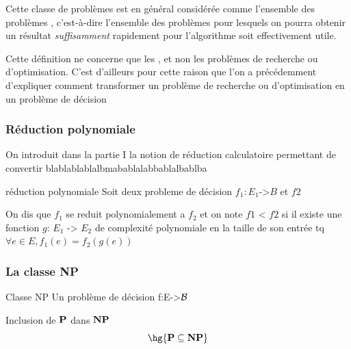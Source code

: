 \documentclass[a4paper,french,bookmarks]{book}
\newcommand{\cP}{\bbP}
\newcommand{\cNP}{\bbN\bbP}
\begin{document}
    Cette classe de problèmes est en général considérée comme l'ensemble des problèmes , c'est-à-dire l'ensemble des problèmes pour lesquels on pourra obtenir un résultat \emph{suffisamment} rapidement pour l'algorithme soit effectivement utile.
    
    \begin{warning}{}{}
        Cette définition ne concerne que les , et non les problèmes de recherche ou d'optimisation. C'est d'ailleurs pour cette raison que l'on a précédemment d'expliquer comment transformer un problème de recherche ou d'optimisation en un problème de décision 
    \end{warning}
    
    
    \subsubsection{Réduction polynomiale}
    
    On introduit dans la partie I la notion de réduction calculatoire permettant de convertir 
    blablablablalbmabablalabbablalbablba
    
    
    \begin{definition}{réduction polynomiale}{}
        Soit deux probleme de décision $f_1: E_1 \text{->} B$ et $f2$
        
        On dis que $f_1$ se reduit polynomialement a $f_2$ et on note $f1$ < $f2$ si il existe une fonction 
        $g$: $E_1$ -> $E_2$ de complexité polynomiale en la taille de son entrée tq $\forall e \in E, f_1(e) = f_2(g(e))$
        
    
    
    \end{definition}
    
    
    \subsubsection{La classe NP}
    
    \begin{definition}{Classe NP}{}
    Un problème de décision f:E->$\mathcal{B}$
        
    \end{definition}

    
    \begin{theorem}{Inclusion de $\cP$ dans $\cNP$}{}
        \[ \hg{\cP \subseteq \cNP}\]
    \end{theorem}
\end{document}
